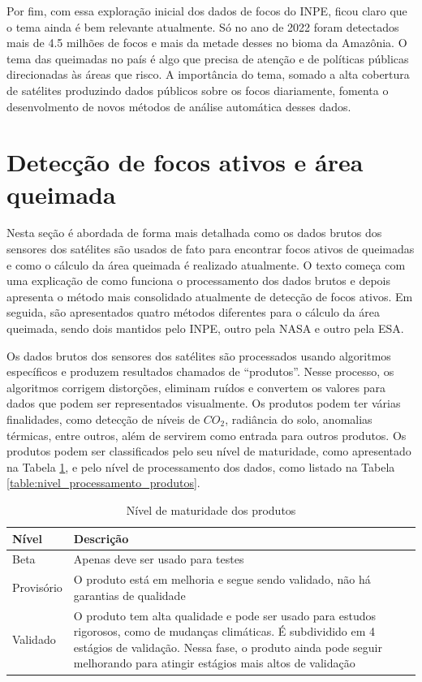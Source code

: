 \documentclass[cic,tc]{iiufrgs}
\begin{document}
Por fim, com essa exploração inicial dos dados de focos do INPE, ficou claro que o tema ainda é bem relevante atualmente. Só no ano de 2022 foram detectados mais de 4.5 milhões de focos e mais da metade desses no bioma da Amazônia. O tema das queimadas no país é algo que precisa de atenção e de políticas públicas direcionadas às áreas que risco. A importância do tema, somado a alta cobertura de satélites produzindo dados públicos sobre os focos diariamente, fomenta o desenvolmento de novos métodos de análise automática desses dados.

\section{Detecção de focos ativos e área queimada}
\label{sec:deteccao_focos_section}

Nesta seção é abordada de forma mais detalhada como os dados brutos dos sensores dos satélites são usados de fato para encontrar focos ativos de queimadas e como o cálculo da área queimada é realizado atualmente. O texto começa com uma explicação de como funciona o processamento dos dados brutos e depois apresenta o método mais consolidado atualmente de detecção de focos ativos. Em seguida, são apresentados quatro métodos diferentes para o cálculo da área queimada, sendo dois mantidos pelo INPE, outro pela NASA e outro pela ESA. 

Os dados brutos dos sensores dos satélites são processados usando algoritmos específicos e produzem resultados chamados de ``produtos''. Nesse processo, os algoritmos corrigem distorções, eliminam ruídos e convertem os valores para dados que podem ser representados visualmente. Os produtos podem ter várias finalidades, como detecção de níveis de $CO_2$, radiância do solo, anomalias térmicas, entre outros, além de servirem como entrada para outros produtos. Os produtos podem ser classificados pelo seu nível de maturidade, como apresentado na Tabela \ref{table:nivel_maturidade_produtos}, e pelo nível de processamento dos dados, como listado na Tabela \ref{table:nivel_processamento_produtos}.

\begin{table}[!htb]
\centering
\caption{Nível de maturidade dos produtos}
\begin{tabular}{ @{}lp{12cm}@{} }
  \toprule
  \textbf{Nível} & \textbf{Descrição} \\
  \midrule
  Beta & Apenas deve ser usado para testes \\
  Provisório & O produto está em melhoria e segue sendo validado, não há garantias de qualidade \\
  Validado & O produto tem alta qualidade e pode ser usado para estudos rigorosos, como de mudanças climáticas. É subdividido em 4 estágios de validação. Nessa fase, o produto ainda pode seguir melhorando para atingir estágios mais altos de validação \\
  \bottomrule
\end{tabular}
\label{table:nivel_maturidade_produtos}
\end{table}
\end{document}
